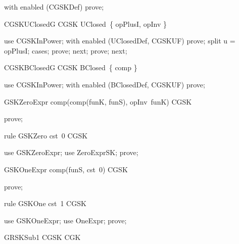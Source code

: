 \documentclass{article}
\begin{document}
\begin{zproof}
with enabled (CGSKDef) prove;
\end{zproof}

\begin{theorem}{CGSKUClosedG}
  CGSK \in UClosed~\{ opPlusI, opInv \}
\end{theorem}

\begin{zproof}
use CGSKInPower;
with enabled (UClosedDef, CGSKUF) prove;
split u = opPlusI;
cases;
prove;
next;
prove;
next;
\end{zproof}

\begin{theorem}{CGSKBClosedG}
  CGSK \in BClosed~\{ comp \}
\end{theorem}

\begin{zproof}
use CGSKInPower;
with enabled (BClosedDef, CGSKUF) prove;
\end{zproof}

\begin{theorem}{GSKZeroExpr}
  comp(comp(funK, funS), opInv~funK) \in CGSK
\end{theorem}

\begin{zproof}
prove;
\end{zproof}

\begin{theorem}{rule GSKZero}
  cst~0 \in CGSK
\end{theorem}

\begin{zproof}
use GSKZeroExpr;
use ZeroExprSK;
prove;
\end{zproof}

\begin{theorem}{GSKOneExpr}
  comp(funS, cst~0) \in CGSK
\end{theorem}

\begin{zproof}
prove;
\end{zproof}

\begin{theorem}{rule GSKOne}
  cst~1 \in CGSK
\end{theorem}

\begin{zproof}
use GSKOneExpr;
use OneExpr;
prove;
\end{zproof}

\begin{theorem}{GRSKSub1}
  CGSK \subseteq CGK
\end{theorem}
\end{document}
